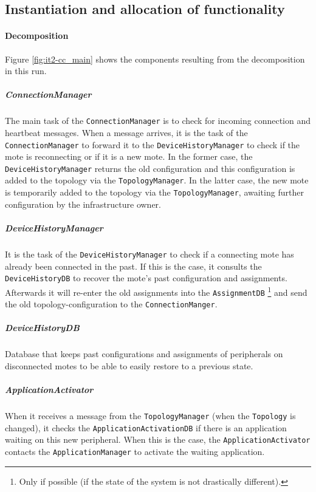 \documentclass[english]{sareport}
\begin{document}
\subsection{Instantiation and allocation of functionality}
\paragraph{Decomposition}
Figure \ref{fig:it2-cc_main} shows the components resulting from the decomposition in this run. 

\subparagraph{ConnectionManager}
The main task of the \texttt{ConnectionManager} is to check for incoming connection and heartbeat messages. When a message arrives, it is the task of the \texttt{ConnectionManager} to forward it to the \texttt{DeviceHistoryManager} to check if the mote is reconnecting or if it is a new mote. In the former case, the \texttt{DeviceHistoryManager} returns the old configuration and this configuration is added to the topology via the \texttt{TopologyManager}. In the latter case, the new mote is temporarily added to the topology via the \texttt{TopologyManager}, awaiting further configuration by the infrastructure owner.

\subparagraph{DeviceHistoryManager}
It is the task of the \texttt{DeviceHistoryManager} to check if a connecting mote has already been connected in the past. If this is the case, it consults the \texttt{DeviceHistoryDB} to recover the mote's past configuration and assignments. Afterwards it will re-enter the old assignments into the \texttt{AssignmentDB} \footnote{Only if possible (if the state of the system is not drastically different).} and send the old topology-configuration to the \texttt{ConnectionManger}.

\subparagraph{DeviceHistoryDB}
Database that keeps past configurations and assignments of peripherals on disconnected motes to be able to easily restore to a previous state.

\subparagraph{ApplicationActivator}
When it receives a message from the \texttt{TopologyManager} (when the \texttt{Topology} is changed), it checks the \texttt{ApplicationActivationDB} if there is an application waiting on this new peripheral. When this is the case, the \texttt{ApplicationActivator} contacts the \texttt{ApplicationManager} to activate the waiting application.
\end{document}
